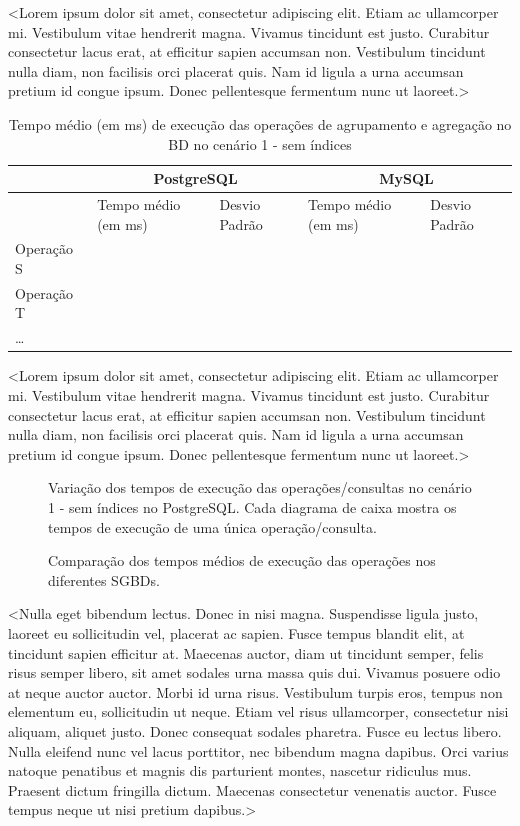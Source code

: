 \documentclass[12pt,a4paper]{article}
\begin{document}
<Lorem ipsum dolor sit amet, consectetur adipiscing elit. Etiam ac ullamcorper mi. Vestibulum vitae hendrerit magna. Vivamus tincidunt est justo. Curabitur consectetur lacus erat, at efficitur sapien accumsan non. Vestibulum tincidunt nulla diam, non facilisis orci placerat quis. Nam id ligula a urna accumsan pretium id congue ipsum. Donec pellentesque fermentum nunc ut laoreet.>

\begin{table}[ht]
\centering
\begin{tabular}{|l|l|l|l|l|}
\hline
 & \multicolumn{2}{c|}{PostgreSQL} & \multicolumn{2}{c|}{MySQL} \\
\hline
 & Tempo médio (em ms) & Desvio Padrão & Tempo médio (em ms) & Desvio Padrão \\
\hline
Operação S & & & & \\
\hline
Operação T & & & & \\
\hline
\dots & & & & \\
\hline
\end{tabular}
\caption{Tempo médio (em ms) de execução das operações de agrupamento e agregação no BD no cenário 1 - sem índices}
\end{table}

<Lorem ipsum dolor sit amet, consectetur adipiscing elit. Etiam ac ullamcorper mi. Vestibulum vitae hendrerit magna. Vivamus tincidunt est justo. Curabitur consectetur lacus erat, at efficitur sapien accumsan non. Vestibulum tincidunt nulla diam, non facilisis orci placerat quis. Nam id ligula a urna accumsan pretium id congue ipsum. Donec pellentesque fermentum nunc ut laoreet.>

\begin{figure}[ht]
\centering
\caption{Variação dos tempos de execução das operações/consultas no cenário 1 - sem índices no PostgreSQL. Cada diagrama de caixa mostra os tempos de execução de uma única operação/consulta.}
\end{figure}

\begin{figure}[ht]
\centering
\caption{Comparação dos tempos médios de execução das operações nos diferentes SGBDs.}
\end{figure}

<Nulla eget bibendum lectus. Donec in nisi magna. Suspendisse ligula justo, laoreet eu sollicitudin vel, placerat ac sapien. Fusce tempus blandit elit, at tincidunt sapien efficitur at. Maecenas auctor, diam ut tincidunt semper, felis risus semper libero, sit amet sodales urna massa quis dui. Vivamus posuere odio at neque auctor auctor. Morbi id urna risus. Vestibulum turpis eros, tempus non elementum eu, sollicitudin ut neque. Etiam vel risus ullamcorper, consectetur nisi aliquam, aliquet justo. Donec consequat sodales pharetra. Fusce eu lectus libero. Nulla eleifend nunc vel lacus porttitor, nec bibendum magna dapibus. Orci varius natoque penatibus et magnis dis parturient montes, nascetur ridiculus mus. Praesent dictum fringilla dictum. Maecenas consectetur venenatis auctor. Fusce tempus neque ut nisi pretium dapibus.>
\end{document}
